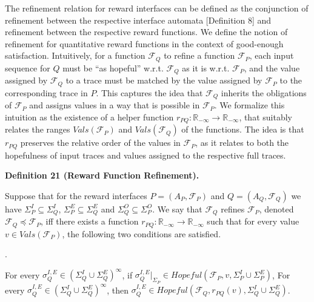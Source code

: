  
 
The refinement relation for reward interfaces can be defined as the conjunction of refinement between the respective interface automata [Definition 8] and refinement between the respective reward functions. We define the notion of refinement for quantitative reward functions in the context of good-enough satisfaction. Intuitively, for a function $\mathcal{F}_{Q}$ to refine a function $\mathcal{F}_{P}$, each input sequence for $Q$ must be “as hopeful” w.r.t. $\mathcal{F}_{Q}$ as it is w.r.t. $\mathcal{F}_{P}$, and the value assigned by $\mathcal{F}_{Q}$ to a trace must be matched by the value assigned by $\mathcal{F}_{P}$ to the corresponding trace in $P$. This captures the idea that $\mathcal{F}_{Q}$ inherits the obligations of $\mathcal{F}_{P}$ and assigns values in a way that is possible in $\mathcal{F}_{P}$. We formalize this intuition as the existence of a helper function $r_{PQ}:\mathbb{R}_{-\infty}\to\mathbb{R}_{-\infty}$, that suitably relates the ranges $\mathit{Vals}(\mathcal{F}_{P})$ and $\mathit{Vals}(\mathcal{F}_{Q})$ of the functions. The idea is that $r_{PQ}$ preserves the relative order of the values in $\mathcal{F}_{P}$, as it relates to both the hopefulness of input traces and values assigned to the respective full traces.\par
 
 
 
\par\medskip\noindent\textbf{Definition 21 (Reward Function Refinement).}\par
 
 
Suppose that for the reward interfaces $P=(A_{P},\mathcal{F}_{P})$ and $Q=(A_{Q},\mathcal{F}_{Q})$ we have $\Sigma_{P}^{I}\subseteq\Sigma_{Q}^{I}$, $\Sigma_{P}^{E}\subseteq\Sigma_{Q}^{E}$ and $\Sigma_{Q}^{O}\subseteq\Sigma_{P}^{O}$. We say that $\mathcal{F}_{Q}$ refines $\mathcal{F}_{P}$, denoted $\mathcal{F}_{Q}\preceq\mathcal{F}_{P}$, iff there exists a function $r_{PQ}:\mathbb{R}_{-\infty}\to\mathbb{R}_{-\infty}$ such that for every value $v\in\mathit{Vals}(\mathcal{F}_{P})$, the following two conditions are satisfied.\par
  
\par{}. 
 
For every $\sigma_{Q}^{I,E}\in(\Sigma_{Q}^{I}\cup\Sigma_{Q}^{E})^{\infty}$, if $\sigma_{Q}^{I,E}|_{\Sigma_{P}}\in\mathit{Hopeful}(\mathcal{F}_{P},v,\Sigma_{P}^{I}\cup\Sigma_{P}^{E})$, For every $\sigma_{Q}^{I,E}\in(\Sigma_{Q}^{I}\cup\Sigma_{Q}^{E})^{\infty}$, then $\sigma_{Q}^{I,E}\in\mathit{Hopeful}(\mathcal{F}_{Q},r_{PQ}(v),\Sigma_{Q}^{I}\cup\Sigma_{Q}^{E})$.\par
 
